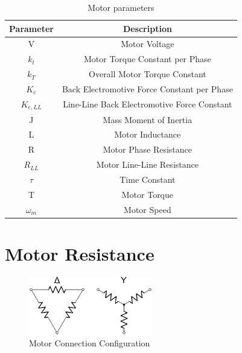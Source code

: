 \begin{table}[ht]
\begin{center}
\caption{Motor parameters}
\begin{tabular}[c]{|c|c|}

\hline
\textbf{Parameter} & \textbf{Description}\\

\hline
V & Motor Voltage\\

\hline
\(k_t\) & Motor Torque Constant per Phase\\

\hline
\(k_T\) & Overall Motor Torque Constant\\

\hline
\(K_e\) & Back Electromotive Force Constant per Phase\\

\hline
\(K_{e,LL}\) & Line-Line Back Electromotive Force Constant\\

\hline
J & Mass Moment of Inertia\\

\hline
L & Motor Inductance\\

\hline
R & Motor Phase Resistance\\

\hline
\(R_{LL}\) & Motor Line-Line Resistance\\

\hline
\(\tau\) & Time Constant\\

\hline
T & Motor Torque\\
\hline
\(\omega_m\) & Motor Speed\\

\hline
\end{tabular}

\label{table2}
\end{center}
\end{table}


\section{Motor Resistance}

\begin{figure}[H]%
	\begin{center}
		\includegraphics[height=1in]{figures/motor_winding.png}
		
		\caption[Motor Connection Configuration]{Motor Connection Configuration}
		
		\label{motor_configuration}
	\end{center}
\end{figure}

